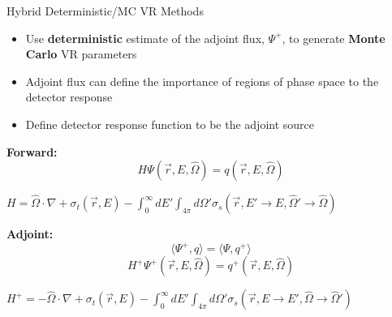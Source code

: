 \documentclass{beamer}
\begin{document}
\begin{frame}{Hybrid Deterministic/MC VR Methods}
\begin{itemize}
\item{Use \textbf{deterministic} estimate of the adjoint flux, $\Psi^+$, to
		generate \textbf{Monte Carlo} VR parameters} %
\item{Adjoint flux can define the importance of regions of phase space to the detector response}
\item{Define detector response function to be the adjoint source}
\end{itemize}
\vspace{0.5cm}
\textbf{Forward:}
\begin{equation} \label{eq:3.1a}
	 H\Psi(\overrightarrow{r}, E,\widehat{\Omega})  = q(\overrightarrow{r}, E,\widehat{\Omega})
\end{equation}
	\begin{center}
		$H = \widehat{\Omega} \cdot \nabla +
		    \sigma_{t}(\overrightarrow{r},E) - 
			\int_{0}^{\infty} dE'
			\int_{4\pi} d\Omega'
			\sigma_{s}( \overrightarrow{r}, E' 
			\rightarrow E, \widehat{\Omega}' 
			\rightarrow \widehat{\Omega} )$
	\end{center}
	\vspace{0.5cm}
\textbf{Adjoint:}
\begin{equation} \label{eq:3.2b}
		\langle \Psi^{+} , q \rangle =
		\langle \Psi, q^{+} \rangle
\end{equation}
       \begin{equation}
	 H^+ \Psi^+(\overrightarrow{r}, E,\widehat{\Omega})  = q^+(\overrightarrow{r}, E,\widehat{\Omega})
       \end{equation} 
	\begin{center}
	$H^{+} = -\widehat{\Omega} \cdot \nabla +
	    \sigma_{t}(\overrightarrow{r},E) - 
		\int_{0}^{\infty} dE'
		\int_{4\pi} d\Omega'
		\sigma_{s}( \overrightarrow{r}, E 
		\rightarrow E', \widehat{\Omega} 
		\rightarrow \widehat{\Omega}' )$
       \end{center}


\end{frame}
\end{document}
